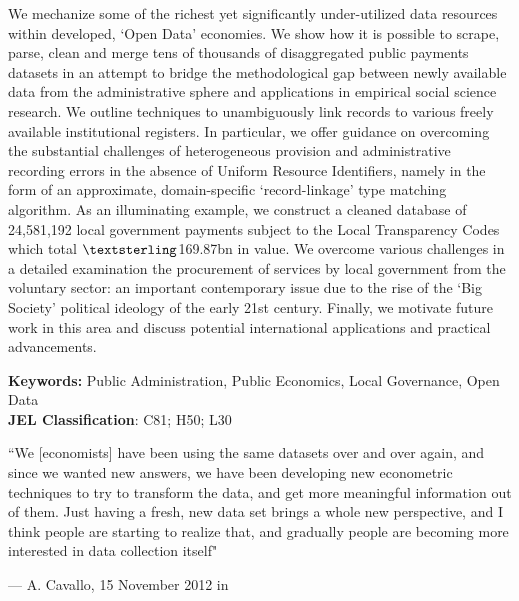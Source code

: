 \documentclass[12pt]{article}
\renewenvironment{abstract}
 {   \linespread{1.2}\selectfont
  \begin{center}
  \bfseries \abstractname\vspace{-.5em}\vspace{0pt}
  \end{center}
  \list{}{%
    \setlength{\leftmargin}{-2.5mm}%
    \setlength{\rightmargin}{\leftmargin}%
  }%
  \item\relax}
 {\endlist}
\begin{document}
\begin{center}

\begin{abstract}
\color{black}
\small{
We mechanize some of the richest yet significantly under-utilized data resources within developed, `Open Data' economies. We show how it is possible to scrape, parse, clean and merge tens of thousands of disaggregated public payments datasets in an attempt to bridge the methodological gap between newly available data from the administrative sphere and applications in empirical social science research. We outline techniques to unambiguously link records to various freely available institutional registers. In particular, we offer guidance on overcoming the substantial challenges of heterogeneous provision and administrative recording errors in the absence of Uniform Resource Identifiers, namely in the form of an approximate, domain-specific `record-linkage' type matching algorithm. As an illuminating example, we construct a cleaned database of 24,581,192 local government payments subject to the Local Transparency Codes which total $\textsterling$169.87bn in value. We overcome various challenges in a detailed examination the procurement of services by local government from the voluntary sector: an important contemporary issue due to the rise of the `Big Society' political ideology of the early 21st century.  Finally, we motivate future work in this area and discuss potential international applications and practical advancements.}
\end{abstract}
\end{center}
\noindent
\textbf{Keywords:} Public Administration, Public Economics, Local Governance, Open Data\\
\noindent  
\textbf{JEL Classification}:  C81; H50; L30\\
\newpage
\normalsize
\renewcommand*{\thefootnote}{\arabic{footnote}}
\setlength{\epigraphwidth}{.6\textwidth}
\epigraph{``We [economists] have been using the same datasets over and over again, and since we wanted new answers, we have been developing new econometric techniques to try to transform the data, and get more meaningful information out of them. Just having a fresh, new data set brings a whole new perspective, and I think people are starting to realize that, and gradually people are becoming more interested in data collection itself"}{--- \textup{A. Cavallo, 15 November 2012 in \cite{taylor}}}
\end{document}

